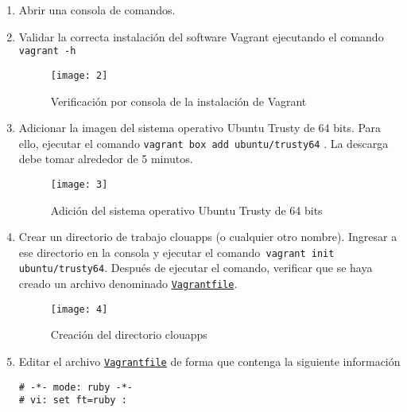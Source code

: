 \documentclass[10pt]{article}   			%
\begin{document}
\begin{enumerate}


	\item  Abrir una consola de comandos.
	\item Validar la correcta instalación del software Vagrant ejecutando el comando \texttt{vagrant -h}
	
	\begin{figure}[ht] %
		\centering
		\texttt{[image: 2]}   %
		\caption{Verificación por consola de la instalación de Vagrant} 
	\end{figure}
	
	\item Adicionar la imagen del sistema operativo Ubuntu Trusty de 64 bits. Para ello, ejecutar el 	comando \texttt{vagrant box add ubuntu/trusty64} . La descarga debe tomar alrededor de 5 minutos.
	
	\begin{figure}[ht] %
		\centering
		\texttt{[image: 3]}   %
		\caption{Adición del sistema operativo Ubuntu Trusty de 64 bits } 
	\end{figure}
	
	\item Crear un directorio de trabajo clouapps (o cualquier otro nombre). Ingresar a ese directorio en la consola y ejecutar el comando\texttt{ vagrant init ubuntu/trusty64}. Después de ejecutar el comando, verificar que se haya creado un archivo denominado \texttt{\href{https://github.com/wilrilo/talleres/blob/master/file/taller4/clouapps/Vagrantfile}{Vagrantfile}}.
	
		\begin{figure}[ht] 
			\centering
			\texttt{[image: 4]}   
			\caption{Creación del directorio clouapps} 
		\end{figure}
\newpage	
	\item Editar el archivo \texttt{\href{https://github.com/wilrilo/talleres/blob/master/file/taller4/clouapps/Vagrantfile}{Vagrantfile}} de forma que contenga la siguiente información
	
	\begin{small}
		\begin{lstlisting}[frame=single]		
# -*- mode: ruby -*-
# vi: set ft=ruby :


\end{lstlisting}
\end{small}
\end{enumerate}
\end{document}
